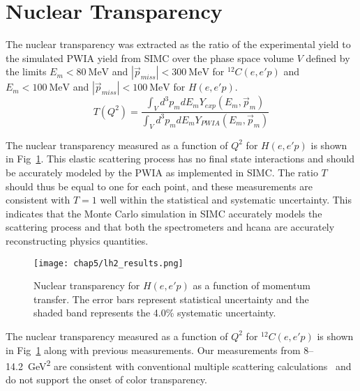 \section{Nuclear Transparency}

The nuclear transparency was extracted as the ratio of the experimental yield
to the simulated PWIA yield from SIMC over the phase space volume $V$
defined by the limits
$E_m<\SI{80}{\mega\electronvolt}$ and
$|\vec{p}_{miss}|<\SI{300}{\mega\electronvolt}$ for ${}^{12}C(e,e'p)$
and
$E_m<\SI{100}{\mega\electronvolt}$ and
$|\vec{p}_{miss}|<\SI{100}{\mega\electronvolt}$ for $H(e,e'p)$.
\begin{equation}
    T(Q^2) = \frac{\int_{V} d^{3} p_{m} d E_{m} Y_{exp }(E_{m}, \vec{p}_{m})}
                  {\int_{V} d^{3} p_{m} d E_{m} Y_{PWIA}(E_{m}, \vec{p}_{m})}
\end{equation}

The nuclear transparency measured as a function of $Q^2$ for $H(e,e'p)$ is
shown in Fig~\ref{fig:lh2_transparency_results}.
This elastic scattering process has no final state interactions and should be
accurately modeled by the PWIA as implemented in SIMC.
The ratio $T$ should thus be equal to one for each point, and these
measurements are consistent with $T=1$ well within the statistical and
systematic uncertainty.
This indicates that the Monte Carlo simulation in SIMC accurately
models the scattering process and that both the spectrometers and
hcana are accurately reconstructing physics quantities.

\begin{figure}[!h]
    \centering
    \texttt{[image: chap5/lh2\_results.png]}
    \caption[Nuclear transparency for $H(e,e'p)$ as a function of
            momentum transfer.]{
            Nuclear transparency for $H(e,e'p)$ as a function of
            momentum transfer.
            The error bars represent statistical uncertainty and the
            shaded band represents the 4.0\% systematic uncertainty.
            }
    \label{fig:lh2_transparency_results}
\end{figure}

The nuclear transparency measured as a function of $Q^2$ for ${}^{12}C(e,e'p)$
is shown in Fig~\ref{fig:lh2_transparency_results} along with previous
measurements.
Our measurements from 8--\SI{14.2}{\giga\electronvolt\squared} are consistent
with conventional multiple scattering calculations~\cite{Pandharipande_1992}
and do not support the onset of color transparency.

